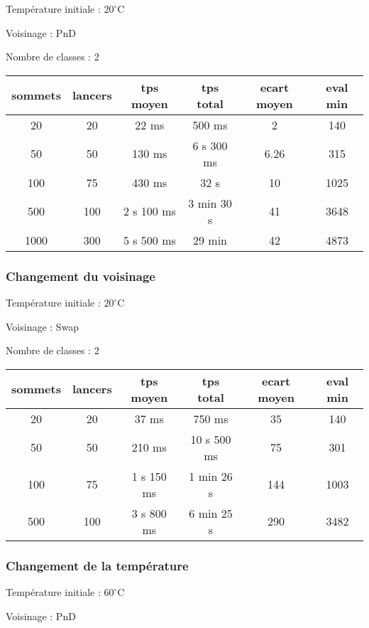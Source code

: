 \documentclass[12pt]{article}
\begin{document}
\bigskip
Température initiale : $20^\circ$C

Voisinage : PnD

Nombre de classes : 2
\bigskip

\begin{tabular}{|c|c|c|c|c|c|}
	\hline 
	sommets & lancers & tps moyen & tps total & ecart moyen & eval min\\
	\hline
20 & 20 & 22 ms & 500 ms & 2 & 140 \\ 
	\hline
	 50  &  50  &   130  ms   &   6 s  300  ms   &   6.26  &   315  \\
	\hline
100  &  75  &   430  ms   &  32 s  &  10   &   1025  \\ 
	\hline
500  &  100  & 2 s 100 ms  &  3 min 30  s &  41  &   3648  \\
	\hline
	1000  &  300  &  5 s 500 ms &  29 min &  42   &   4873  \\ 
	\hline
\end{tabular}
\bigskip

\subsubsection*{Changement du voisinage}

Température initiale : $20^\circ$C

Voisinage : Swap

Nombre de classes : 2
\bigskip

\begin{tabular}{|c|c|c|c|c|c|}
	\hline 
	sommets & lancers & tps moyen & tps total & ecart moyen & eval min\\
	\hline
	20 & 20 & 37 ms & 750 ms & 35 & 140 \\
	\hline
	 50  &  50  &   210  ms   &   10 s  500  ms   &  75   &   301  \\
	\hline
	 100  &  75  & 1 s 150  ms   &  1 min 26 s &  144   &   1003  \\
	\hline
	 500  &  100  & 3 s 800  ms  &  6 min 25  s &   290  &   3482  \\
	\hline
\end{tabular}
\bigskip

\subsubsection*{Changement de la température}

Température initiale : $60^\circ$C

Voisinage : PnD
\end{document}
